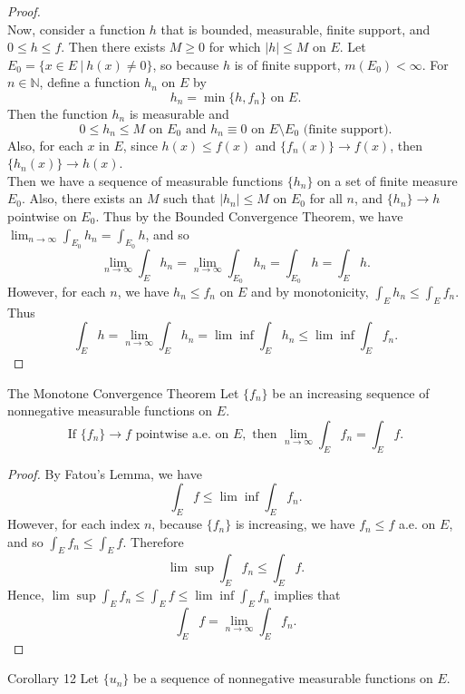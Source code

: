 \begin{flushleft}
\begin{proof}
        \\\bigskip Now, consider a function $h$ that is bounded, measurable, finite support, and $0\le h\le f$.
        Then there exists $M\ge0$ for which $|h|\le M$ on $E$.
        Let $E_0=\{x\in E\ |\ h(x)\neq0\}$, so because $h$ is of finite support, $m(E_0)<\infty$.
        For $n\in\mathbb{N}$, define a function $h_n$ on $E$ by
        \[
            h_n=\min\{h,f_n\}\text{ on }E.    
        \]
        Then the function $h_n$ is measurable and
        \[
            0\le h_n\le M\text{ on }E_0\text{ and }h_n\equiv0\text{ on }E\setminus E_0\text{ (finite support)}.
        \]
        Also, for each $x$ in $E$, since $h(x)\le f(x)$ and $\{f_n(x)\}\to f(x)$, then $\{h_n(x)\}\to h(x)$.
        \\Then we have a sequence of measurable functions $\{h_n\}$ on a set of finite measure $E_0$.
        Also, there exists an $M$ such that $|h_n|\le M$ on $E_0$ for all $n$, and $\{h_n\}\to h$ pointwise on $E_0$. 
        Thus by the Bounded Convergence Theorem, we have $\lim_{n\to\infty}\int_{E_0}h_n=\int_{E_0}h$, and so
        \[
            \lim_{n\to\infty}\int_{E}h_n=\lim_{n\to\infty}\int_{E_0}h_n=\int_{E_0}h=\int_Eh.
        \]
        However, for each $n$, we have $h_n\le f_n$ on $E$ and by monotonicity, $\int_Eh_n\le\int_Ef_n$.
        Thus
        \[
            \int_Eh=\lim_{n\to\infty}\int_{E}h_n=\lim\inf\int_{E}h_n\le\lim\inf\int_{E}f_n.    
        \]
    \end{proof}
    \begin{namedthm*}{The Monotone Convergence Theorem}
        Let $\{f_n\}$ be an increasing sequence of nonnegative measurable functions on $E$.
        \[
            \text{If }\{f_n\}\to f\text{ pointwise a.e. on }E,\text{ then }\lim_{n\to\infty}\int_Ef_n=\int_Ef.
        \]
    \end{namedthm*}
    \begin{proof}
        By Fatou's Lemma, we have
        \[
            \int_Ef\le\lim\inf\int_Ef_n.  
        \]
        However, for each index $n$, because $\{f_n\}$ is increasing, we have $f_n\le f$ a.e. on $E$, and so $\int_Ef_n\le\int_Ef$.
        Therefore
        \[
            \lim\sup\int_Ef_n\le\int_Ef.
        \]
        Hence, $\lim\sup\int_Ef_n\le\int_Ef\le\lim\inf\int_Ef_n$ implies that
        \[
            \int_Ef=\lim_{n\to\infty}\int_Ef_n.
        \]
    \end{proof}
    \begin{namedthm*}{Corollary 12}
        Let $\{u_n\}$ be a sequence of nonnegative measurable functions on $E$.

\end{namedthm*}
\end{flushleft}
